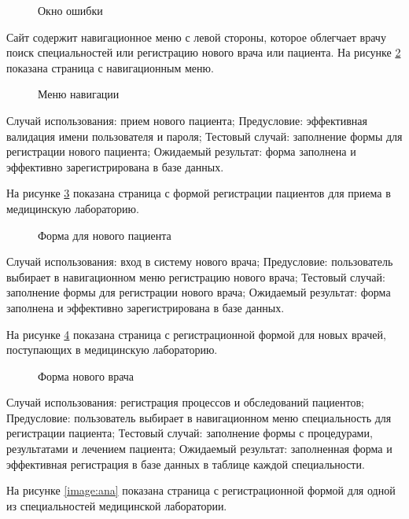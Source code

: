\begin{figure}
	\caption{Окно ошибки}
	\label{image:error}
\end{figure}

Сайт содержит навигационное меню с левой стороны, которое облегчает врачу поиск специальностей или регистрацию нового врача или пациента.
На рисунке \ref{image:menu} показана страница с навигационным меню.

\begin{figure}
	\caption{Меню навигации}
	\label{image:menu}
\end{figure}

Случай использования: прием нового пациента;
Предусловие: эффективная валидация имени пользователя и пароля;
Тестовый случай: заполнение формы для регистрации нового пациента;
Ожидаемый результат: форма заполнена и эффективно зарегистрирована в базе данных.

На рисунке \ref{image:pac} показана страница с формой регистрации пациентов для приема в медицинскую лабораторию.

\begin{figure}
	\caption{Форма для нового пациента}
	\label{image:pac}
\end{figure}

Случай использования: вход в систему нового врача;
Предусловие: пользователь выбирает в навигационном меню регистрацию нового врача;
Тестовый случай: заполнение формы для регистрации нового врача;
Ожидаемый результат: форма заполнена и эффективно зарегистрирована в базе данных.

На рисунке \ref{image:doc} показана страница с регистрационной формой для новых врачей, поступающих в медицинскую лабораторию.

\begin{figure}
	\caption{Форма нового врача}
	\label{image:doc}
\end{figure}

Случай использования: регистрация процессов и обследований пациентов;
Предусловие: пользователь выбирает в навигационном меню специальность для регистрации пациента;
Тестовый случай: заполнение формы с процедурами, результатами и лечением пациента;
Ожидаемый результат: заполненная форма и эффективная регистрация в базе данных в таблице каждой специальности.

На рисунке \ref{image:ana} показана страница с регистрационной формой для одной из специальностей медицинской лаборатории.

